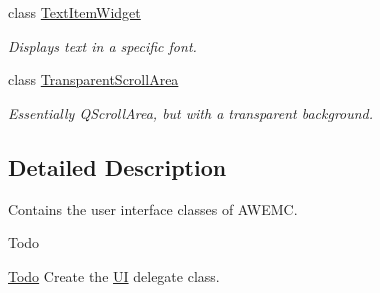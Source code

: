 \begin{DoxyCompactItemize}
class \hyperlink{class_u_i_1_1_text_item_widget}{Text\-Item\-Widget}
\begin{DoxyCompactList}\small\item\em Displays text in a specific font. \end{DoxyCompactList}\item 
class \hyperlink{class_u_i_1_1_transparent_scroll_area}{Transparent\-Scroll\-Area}
\begin{DoxyCompactList}\small\item\em Essentially {\ttfamily Q\-Scroll\-Area}, but with a transparent background. \end{DoxyCompactList}\end{DoxyCompactItemize}


\subsection{Detailed Description}
Contains the user interface classes of A\-W\-E\-M\-C. \begin{DoxyRefDesc}{Todo}
\item[\hyperlink{todo__todo000009}{Todo}]Create the \hyperlink{namespace_u_i}{U\-I} delegate class. \end{DoxyRefDesc}

